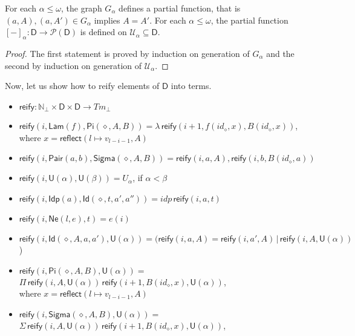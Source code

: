 \documentclass{amsart}
\theoremstyle{definition}
\theoremstyle{remark}
\newcommand{\D}{\mathsf{D}}
\newcommand{\nats}{\mathbb{N}}
\numberwithin{table}{section}
\begin{document}
\begin{lem}
For each $\alpha \leq \omega$, the graph $G_\alpha$ defines a partial function, that is $(a, A), (a, A') \in G_\alpha$ implies $A = A'$.
For each $\alpha \leq \omega$, the partial function $[ - ]_\alpha : \D \to \mathscr{P}(\D)$ is defined on $\mathcal{U}_\alpha \subseteq \D$.
\end{lem}
\begin{proof}
The first statement is proved by induction on generation of $G_\alpha$ and the second by induction on generation of $\mathcal{U}_\alpha$.
\end{proof}

Now, let us show how to reify elements of $\D$ into terms.
\begin{itemize}
\item[] $\mathsf{reify} : \nats_\bot \times \D \times \D \to Tm_\bot$
\item[] $\mathsf{reify}(i, \mathsf{Lam}(f), \mathsf{Pi}(\diamond, A, B)) = \lambda\,\mathsf{reify}(i + 1, f(id_\diamond, x), B(id_\diamond, x))$, \\
        \indent where $x = \mathsf{reflect}(l \mapsto v_{l - i - 1}, A)$
\item[] $\mathsf{reify}(i, \mathsf{Pair}(a, b), \mathsf{Sigma}(\diamond, A, B)) = \mathsf{reify}(i, a, A), \mathsf{reify}(i, b, B(id_\diamond, a))$
\item[] $\mathsf{reify}(i, \mathsf{U}(\alpha), \mathsf{U}(\beta)) = U_\alpha$, if $\alpha < \beta$
\item[] $\mathsf{reify}(i, \mathsf{Idp}(a), \mathsf{Id}(\diamond, t, a', a'')) = idp\,\mathsf{reify}(i, a, t)$
\item[] $\mathsf{reify}(i, \mathsf{Ne}(l, e), t) = e(i)$
\item[] $\mathsf{reify}(i, \mathsf{Id}(\diamond, A, a, a'), \mathsf{U}(\alpha)) = (\mathsf{reify}(i, a, A) = \mathsf{reify}(i, a', A)\,|\,\mathsf{reify}(i, A, \mathsf{U}(\alpha))$)
\item[] $\mathsf{reify}(i, \mathsf{Pi}(\diamond, A, B), \mathsf{U}(\alpha)) =$
        $\Pi\,\mathsf{reify}(i, A, \mathsf{U}(\alpha))\,\mathsf{reify}(i + 1, B(id_\diamond, x), \mathsf{U}(\alpha))$, \\
        \indent where $x = \mathsf{reflect}(l \mapsto v_{l - i - 1}, A)$
\item[] $\mathsf{reify}(i, \mathsf{Sigma}(\diamond, A, B), \mathsf{U}(\alpha)) = $
        $\Sigma\,\mathsf{reify}(i, A, \mathsf{U}(\alpha))\,\mathsf{reify}(i + 1, B(id_\diamond, x), \mathsf{U}(\alpha))$, \\

\end{itemize}
\end{document}
